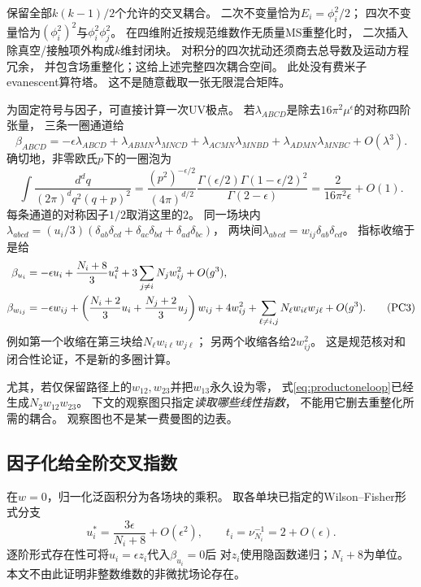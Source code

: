 \documentclass[11pt,a4paper]{ctexart}
\theoremstyle{cnplain}\newtheorem{theorem}{定理}[section]
\theoremstyle{definition}\newtheorem{definition}[theorem]{定义}
\theoremstyle{remark}\newtheorem{remark}[theorem]{注}
\begin{document}
保留全部$k(k-1)/2$个允许的交叉耦合。
二次不变量恰为$E_i=\phi_i^2/2$；
四次不变量恰为$(\phi_i^2)^2$与$\phi_i^2\phi_j^2$。
在四维附近按规范维数作无质量MS重整化时，
二次插入除真空/接触项外构成$k$维封闭块。
对积分的四次扰动还须商去总导数及运动方程冗余，
并包含场重整化；这给上述完整四次耦合空间。
此处没有费米子evanescent算符塔。
这不是随意截取一张无限混合矩阵。

为固定符号与因子，可直接计算一次UV极点。
若$\lambda_{ABCD}$是除去$16\pi^2\mu^\epsilon$的对称四阶张量，
三条一圈通道给
\[
 \beta_{ABCD}=-\epsilon\lambda_{ABCD}
 +\lambda_{ABMN}\lambda_{MNCD}
 +\lambda_{ACMN}\lambda_{MNBD}
 +\lambda_{ADMN}\lambda_{MNBC}+O(\lambda^3).
                                                               \tag{PC2}
\]
确切地，非零欧氏$p$下的一圈泡为
\[
 \int\frac{d^dq}{(2\pi)^d q^2(q+p)^2}
 =\frac{(p^2)^{-\epsilon/2}}{(4\pi)^{d/2}}
   \frac{\Gamma(\epsilon/2)\Gamma(1-\epsilon/2)^2}
        {\Gamma(2-\epsilon)}
 =\frac{2}{16\pi^2\epsilon}+O(1).
\]
每条通道的对称因子$1/2$取消这里的$2$。
同一场块内
$\lambda_{abcd}=(u_i/3)(\delta_{ab}\delta_{cd}
+\delta_{ac}\delta_{bd}+\delta_{ad}\delta_{bc})$，
两块间$\lambda_{ab\,cd}=w_{ij}\delta_{ab}\delta_{cd}$。
指标收缩于是给
\begin{align}
 \beta_{u_i}&=-\epsilon u_i+\frac{N_i+8}{3}u_i^2
                 +3\sum_{j\ne i}N_j w_{ij}^2+O(g^3), \notag\\
 \beta_{w_{ij}}&=-\epsilon w_{ij}
  +\left(\frac{N_i+2}{3}u_i+\frac{N_j+2}{3}u_j\right)w_{ij}
  +4w_{ij}^2+\sum_{\ell\ne i,j}N_\ell w_{i\ell}w_{j\ell}
  +O(g^3).                                               \tag{PC3}\label{eq:productoneloop}
\end{align}
例如第一个收缩在第三块给$N_\ell w_{i\ell}w_{j\ell}$；
另两个收缩各给$2w_{ij}^2$。
这是规范核对和闭合性论证，不是新的多圈计算。

尤其，若仅保留路径上的$w_{12},w_{23}$并把$w_{13}$永久设为零，
式\eqref{eq:productoneloop}已经生成$N_2w_{12}w_{23}$。
下文的观察图只指定\emph{读取哪些线性指数}，
不能用它删去重整化所需的耦合。
观察图也不是某一费曼图的边表。

\subsection{因子化给全阶交叉指数}

在$w=0$，归一化泛函积分为各场块的乘积。
取各单块已指定的Wilson--Fisher形式分支
\[
 u_i^*=\frac{3\epsilon}{N_i+8}+O(\epsilon^2),\qquad
 t_i=\nu_{N_i}^{-1}=2+O(\epsilon).
\]
逐阶形式存在性可将$u_i=\epsilon z_i$代入$\beta_{u_i}=0$后
对$z_i$使用隐函数递归；$N_i+8$为单位。
本文不由此证明非整数维数的非微扰场论存在。
\end{document}
